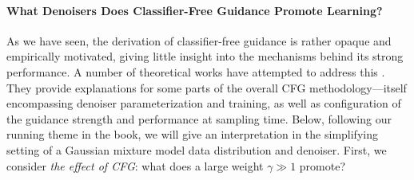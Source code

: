 \documentclass[../../book-main.tex]{subfiles}
\begin{document}
\paragraph{What Denoisers Does Classifier-Free Guidance Promote Learning?}
As we have seen, the derivation of classifier-free guidance is rather opaque and
empirically motivated,
giving little insight into the mechanisms behind its strong performance.
A number of theoretical works have attempted to address this
\cite{Bradley2024-jg,Li2025-li,Wu2024-js}.
They provide explanations for some parts of the overall CFG
methodology---itself encompassing denoiser
parameterization and training, as well as configuration of the guidance strength
and performance at sampling time.
Below, following our running theme in the book, we will give an interpretation
in the simplifying setting of a Gaussian mixture model data distribution and
denoiser.
First, we consider \textit{the effect of CFG}: what does a large weight $\gamma
\gg 1$ promote?
\end{document}
